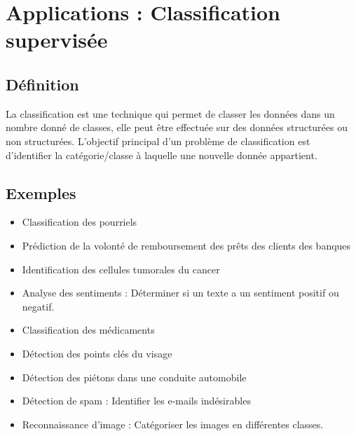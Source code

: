 \documentclass[12pt,a4paper,openay]{book}
\numberwithin{equation}{chapter}
\begin{document}
	
	\newpage
	\chapter{Applications : Classification supervis\'ee}
	
	\section{D\'efinition}
	La classification est une technique qui permet de classer les donn\'ees dans 
	un nombre donn\'e de classes, elle peut \^etre effectu\'ee sur des donn\'ees 
	structur\'ees ou non structur\'ees.
	L'objectif principal d'un probl\`eme de classification est d'identifier la 
	cat\'egorie/classe \`a laquelle une nouvelle donn\'ee appartient.
	
	\section{Exemples}
	\begin{onehalfspace}
	\begin{itemize}
			\item  Classification des pourriels
			\item Pr\'ediction de la volont\'e de remboursement des pr\^ets des clients des banques
			\item Identification des cellules tumorales du cancer
			\item Analyse des sentiments : D\'eterminer si un texte a un sentiment positif ou negatif. 
			\item Classification des m\'edicaments
			\item D\'etection des points cl\'es du visage
			\item D\'etection des pi\'etons dans une conduite automobile
			\item D\'etection de spam : Identifier les e-mails ind\'esirables
			\item Reconnaissance d'image : Cat\'egoriser les images en diff\'erentes classes.
	\end{itemize}
	\end{onehalfspace}
\end{document}
